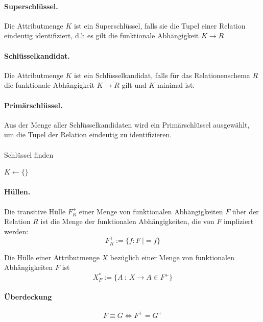 \documentclass[]{scrartcl}
\begin{document}
\paragraph{Superschl\"ussel.} Die Attributmenge $K$ ist ein Superschl\"ussel, falls sie die Tupel einer Relation eindeutig identifiziert, d.h es gilt die funktionale Abh\"angigkeit
$K \to R$

\paragraph{Schl\"usselkandidat.} Die Attributmenge $K$ ist ein Schl\"usselkandidat, falls f\"ur das Relationenschema $R$ die funktionale Abh\"angigkeit
$K \rightarrow R$
gilt und $K$ minimal ist.

\paragraph{Prim\"arschl\"ussel.} Aus der Menge aller Schl\"usselkandidaten wird ein Prim\"arschl\"ussel ausgew\"ahlt, um die Tupel der Relation eindeutig zu identifizieren.

\paragraph{}

\begin{algorithm}[H]
\caption{Schl\"ussel finden}
$K \gets \{ \}$ \\
 {
	 {
	}
}


\end{algorithm}


\paragraph{H\"ullen.}

Die transitive H\"ulle $F_{R}^+$ einer Menge von funktionalen Abh\"angigkeiten $F$ \"uber der Relation $R$ ist die Menge der funktionalen Abh\"angigkeiten, die von $F$ impliziert werden:
$$F_{R}^+ := \{ f : F \ |= f \}$$

Die H\"ulle einer Attributmenge $X$ bez\"uglich einer Menge von funktionalen Abh\"angigkeiten $F$ ist
$$X^*_{F} := \{A\ : \ X \to A \in F^+ \}$$

\paragraph{\"Uberdeckung}
$$F \equiv G \Leftrightarrow F^+ = G^+ $$
\end{document}
